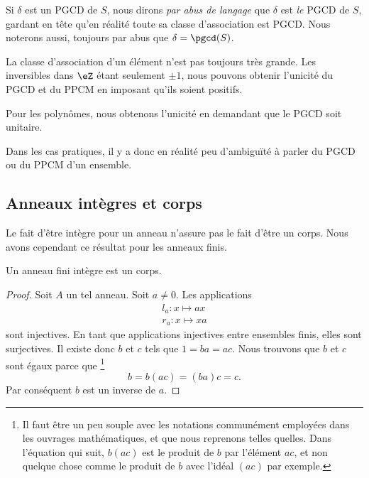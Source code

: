 Si \( \delta\) est un PGCD de \( S\), nous dirons \emph{par abus de langage} que \( \delta\) est \emph{le} PGCD de \( S\), gardant en tête qu'en réalité toute sa classe d'association est PGCD. Nous noterons aussi, toujours par abus que \( \delta=\pgcd(S)\).

\begin{remark}
	La classe d'association d'un élément n'est pas toujours très grande. Les inversibles dans \( \eZ\) étant seulement \( \pm 1\), nous pouvons obtenir l'unicité du PGCD et du PPCM en imposant qu'ils soient positifs.

	Pour les polynômes, nous obtenons l'unicité en demandant que le PGCD soit unitaire.

	Dans les cas pratiques, il y a donc en réalité peu d'ambiguïté à parler du PGCD ou du PPCM d'un ensemble.
\end{remark}

\subsection{Anneaux intègres et corps}

Le fait d'être intègre pour un anneau n'assure pas le fait d'être un corps. Nous avons cependant ce résultat pour les anneaux finis.

\begin{proposition}     \label{PropanfinintimpCorp}
	Un anneau fini intègre est un corps.
\end{proposition}

\begin{proof}
	Soit \( A\) un tel anneau. Soit \( a\neq 0\). Les applications
	\begin{subequations}
		\begin{align}
			l_a\colon x\mapsto ax \\
			r_a\colon x\mapsto xa
		\end{align}
	\end{subequations}
	sont injectives. En tant que applications injectives entre ensembles finis, elles sont surjectives. Il existe donc \( b\) et \( c\) tels que \( 1=ba=ac\). Nous trouvons que \( b\) et \( c\) sont égaux parce que
	\footnote{Il faut être un peu souple avec les notations communément employées dans les ouvrages mathématiques, et que nous reprenons telles quelles. Dans l'équation qui suit, \( b(ac)\) est le produit de \( b\) par l'élément \( ac\), et non quelque chose comme le produit de \( b\) avec l'idéal \( (ac)\) par exemple.}
	\begin{equation}
		b=b(ac)=(ba)c=c.
	\end{equation}
	Par conséquent \( b\) est un inverse de \( a\).
\end{proof}

